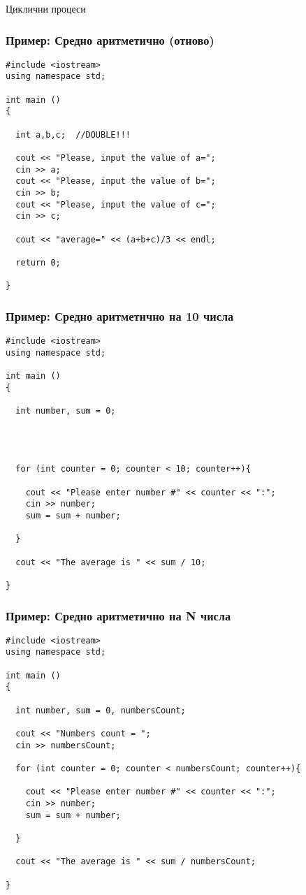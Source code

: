 \documentclass{beamer}
\begin{document}
\begin{frame}
\centerline{Циклични процеси}
\end{frame}



\begin{frame}[fragile]
\frametitle{Пример: Средно аритметично (отново)}

\begin{lstlisting}
#include <iostream>
using namespace std;

int main ()
{

  int a,b,c;  //DOUBLE!!!

  cout << "Please, input the value of a=";
  cin >> a;
  cout << "Please, input the value of b=";
  cin >> b;
  cout << "Please, input the value of c=";
  cin >> c;

  cout << "average=" << (a+b+c)/3 << endl;

  return 0;

}
\end{lstlisting}

\end{frame}

\begin{frame}[fragile]
\frametitle{Пример: Средно аритметично на 10 числа}

\begin{lstlisting}
#include <iostream>
using namespace std;

int main ()
{

  int number, sum = 0;




  for (int counter = 0; counter < 10; counter++){

    cout << "Please enter number #" << counter << ":";
    cin >> number;
    sum = sum + number;

  }

  cout << "The average is " << sum / 10;

}
\end{lstlisting}

\end{frame}

\begin{frame}[fragile]
\frametitle{Пример: Средно аритметично на N числа}

\begin{lstlisting}
#include <iostream>
using namespace std;

int main ()
{

  int number, sum = 0, numbersCount;

  cout << "Numbers count = ";
  cin >> numbersCount;

  for (int counter = 0; counter < numbersCount; counter++){

    cout << "Please enter number #" << counter << ":";
    cin >> number;
    sum = sum + number;

  }

  cout << "The average is " << sum / numbersCount;

}
\end{lstlisting}

\end{frame}
\end{document}
